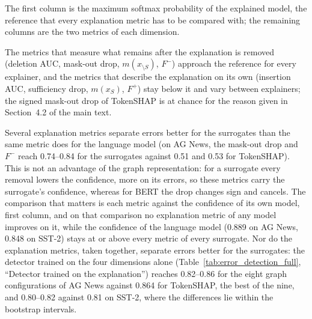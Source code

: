 \documentclass[review,12pt]{elsarticle}
\begin{document}
The first column is the maximum softmax probability of the explained model, the reference that every explanation metric has to be compared with; the remaining columns are the two metrics of each dimension.

The metrics that measure what remains after the explanation is removed (deletion AUC, mask-out drop, \(m(x_{\setminus S})\), \(F^{-}\)) approach the reference for every explainer, and the metrics that describe the explanation on its own (insertion AUC, sufficiency drop, \(m(x_S)\), \(F^{+}\)) stay below it and vary between explainers; the signed mask-out drop of TokenSHAP is at chance for the reason given in Section~4.2 of the main text.

Several explanation metrics separate errors better for the surrogates than the same metric does for the language model (on AG News, the mask-out drop and \(F^{-}\) reach 0.74--0.84 for the surrogates against 0.51 and 0.53 for TokenSHAP). This is not an advantage of the graph representation: for a surrogate every removal lowers the confidence, more on its errors, so these metrics carry the surrogate's confidence, whereas for BERT the drop changes sign and cancels. The comparison that matters is each metric against the confidence of its own model, first column, and on that comparison no explanation metric of any model improves on it, while the confidence of the language model (0.889 on AG News, 0.848 on SST-2) stays at or above every metric of every surrogate. Nor do the explanation metrics, taken together, separate errors better for the surrogates: the detector trained on the four dimensions alone (Table~\ref{tab:error_detection_full}, ``Detector trained on the explanation'') reaches 0.82--0.86 for the eight graph configurations of AG News against 0.864 for TokenSHAP, the best of the nine, and 0.80--0.82 against 0.81 on SST-2, where the differences lie within the bootstrap intervals.

\begin{table}[H]
\centering
\scriptsize
\setlength{\tabcolsep}{3pt}
\caption{Error-oriented AUROC of individual explanation metrics used alone as an error score (gold-label errors, 10-fold out-of-fold), next to the maximum softmax probability (MSP) of the explained model, for each explainer--representation configuration. \(m(x_{\setminus S})\) and \(m(x_S)\): margin after removing the explanation and margin of the explanation alone (Dimension~3); \(F^{-}\) and \(F^{+}\): necessity and sufficiency (Dimension~4).}
\label{tab:single_feature}
\end{table}
\end{document}
